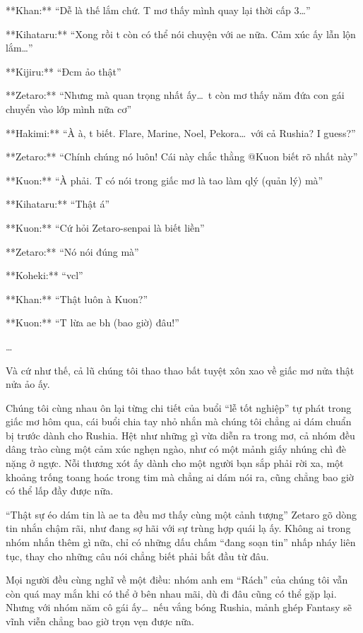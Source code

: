 \documentclass[../main.tex]{subfiles}
\begin{document}
**Khan:** ``Dễ là thế lắm chứ. T mơ thấy mình quay lại thời cấp 3\dots''

**Kihataru:** ``Xong rồi t còn có thể nói chuyện với ae nữa. Cảm xúc ấy lẫn lộn lắm\dots''

**Kijiru:** ``Đcm ảo thật''

**Zetaro:** ``Nhưng mà quan trọng nhất ấy\dots\ t còn mơ thấy năm đứa con gái chuyển vào lớp mình nữa cơ''

**Hakimi:** ``À à, t biết. Flare, Marine, Noel, Pekora\dots\ với cả Rushia? I guess?''

**Zetaro:** ``Chính chúng nó luôn! Cái này chắc thằng @Kuon biết rõ nhất này''

**Kuon:** ``À phải. T có nói trong giấc mơ là tao làm qlý (quản lý) mà''

**Kihataru:** ``Thật á''

**Kuon:** ``Cứ hỏi Zetaro-senpai là biết liền''

**Zetaro:** ``Nó nói đúng mà''

**Koheki:** ``vcl''

**Khan:** ``Thật luôn à Kuon?''

**Kuon:** ``T lừa ae bh (bao giờ) đâu!''

\dots

Và cứ như thế, cả lũ chúng tôi thao thao bất tuyệt xôn xao về giấc mơ nửa thật nửa ảo ấy.

Chúng tôi cùng nhau ôn lại từng chi tiết của buổi ``lễ tốt nghiệp'' tự phát trong giấc mơ hôm qua, cái buổi chia tay nhỏ nhắn mà chúng tôi chẳng ai dám chuẩn bị trước dành cho Rushia. Hệt như những gì vừa diễn ra trong mơ, cả nhóm đều dâng trào cùng một cảm xúc nghẹn ngào, như có một mảnh giấy nhúng chì đè nặng ở ngực. Nỗi thương xót ấy dành cho một người bạn sắp phải rời xa, một khoảng trống toang hoác trong tim mà chẳng ai dám nói ra, cũng chẳng bao giờ có thể lấp đầy được nữa.

``Thật sự éo dám tin là ae ta đều mơ thấy cùng một cảnh tượng'' Zetaro gõ dòng tin nhắn chậm rãi, như đang sợ hãi với sự trùng hợp quái lạ ấy. Không ai trong nhóm nhắn thêm gì nữa, chỉ có những dấu chấm ``đang soạn tin'' nhấp nháy liên tục, thay cho những câu nói chẳng biết phải bắt đầu từ đâu.

Mọi người đều cùng nghĩ về một điều: nhóm anh em ``Rách'' của chúng tôi vẫn còn quá may mắn khi có thể ở bên nhau mãi, dù đi đâu cũng có thể gặp lại. Nhưng với nhóm năm cô gái ấy\dots\ nếu vắng bóng Rushia, mảnh ghép Fantasy sẽ vĩnh viễn chẳng bao giờ trọn vẹn được nữa.
\end{document}
